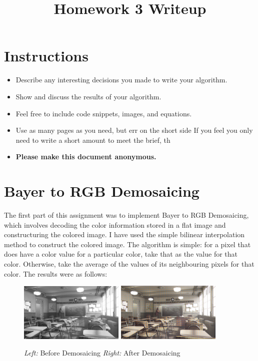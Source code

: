 \title{\vspace{-1cm}Homework 3 Writeup}



\maketitle
\vspace{-3cm}
\thispagestyle{fancy}

\section*{Instructions}
\begin{itemize}
  \item Describe any interesting decisions you made to write your algorithm.
  \item Show and discuss the results of your algorithm.
  \item Feel free to include code snippets, images, and equations.
  \item Use as many pages as you need, but err on the short side If you feel you only need to write a short amount to meet the brief, th
  \item \textbf{Please make this document anonymous.}
\end{itemize}

\section*{Bayer to RGB Demosaicing}
The first part of this assignment was to implement Bayer to RGB Demosaicing, which involves decoding the color information stored in a flat image and constructuring the colored image. I have used the simple bilinear interpolation method to construct the colored image. The algorithm is simple: for a pixel that does have a color value for a particular color, take that as the value for that color. Otherwise, take the average of the values of its neighbouring pixels for that color. The results were as follows:

\begin{figure}[h]
    \centering
    \includegraphics[width=5cm]{bayer_before.png}
    \includegraphics[width=5cm]{bayer_after.png}
    \caption{\emph{Left:} Before Demosaicing \emph{Right:} After Demosaicing}
    \label{fig:result1}
\end{figure}


